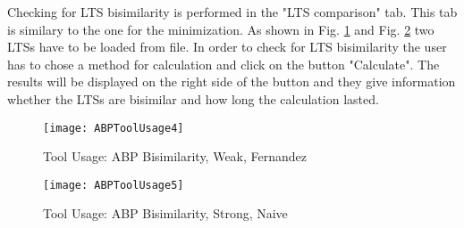 Checking for LTS bisimilarity is performed in the "LTS comparison" tab. This tab is 
similary to the one for the minimization. As shown in Fig. \ref{fig:abptoolusage4} and
Fig. \ref{fig:abptoolusage5} two LTSs have to be loaded from file. In order to check for LTS 
bisimilarity the user has to chose a method for calculation and click on the button 
"Calculate". The results will be displayed on the right side of the button and they
give information whether the LTSs are bisimilar and how long the calculation lasted.

\begin{figure}
\centering
\texttt{[image: ABPToolUsage4]}
\caption{Tool Usage: ABP Bisimilarity, Weak, Fernandez}
\label{fig:abptoolusage4}
\end{figure}

\begin{figure}
\centering
\texttt{[image: ABPToolUsage5]}
\caption{Tool Usage: ABP Bisimilarity, Strong, Naive}
\label{fig:abptoolusage5}
\end{figure}